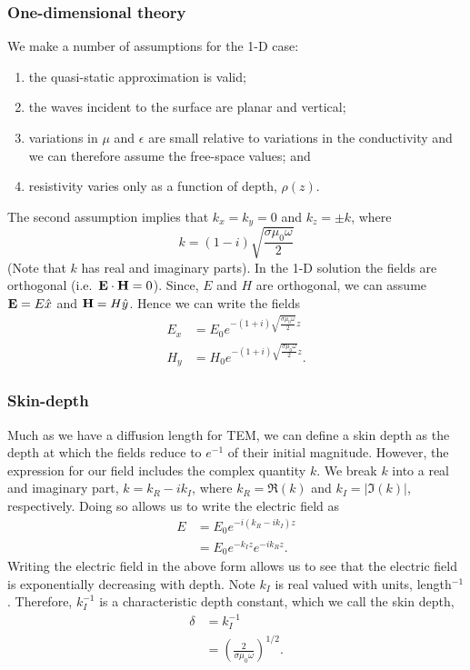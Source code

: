 \subsubsection{One-dimensional theory}
We make a number of assumptions for the 1-D case:
\begin{enumerate}
    \item the quasi-static approximation is valid; 
    \item the waves incident to the surface are planar and vertical;
    \item variations in $\mu$ and $\epsilon$ are small relative to variations in
    the conductivity and we can therefore assume the free-space values; and
    \item resistivity varies only as a function of depth, $\rho(z)$.
\end{enumerate}
The second assumption implies that $k_{x} = k_{y} = 0$ and $k_{z} = \pm k$,
where
\begin{equation}
    k = (1 - i) \sqrt{\frac{\sigma \mu_0 \omega}{2}}
\end{equation}
(Note that $k$ has real and imaginary parts).
In the 1-D solution the fields are orthogonal (i.e.\ $\vb{E} \cdot \vb{H} =
0$).  Since, $E$ and $H$ are orthogonal, we can assume $\vb{E} = E\hat{x}$ and
$\vb{H} = H\hat{y}$.  Hence we can write the fields
\begin{align}
    E_x & = E_0 e^{-(1 + i) \sqrt{\frac{\sigma \mu_0 \omega}{2}} z} \\
    H_y & = H_0 e^{-(1 + i) \sqrt{\frac{\sigma \mu_0 \omega}{2}} z}.
\end{align}

\subsubsection{Skin-depth}
Much as we have a diffusion length for TEM, we can define a skin depth as the
depth at which the fields reduce to $e^{-1}$ of their initial
magnitude.  However, the expression for our field includes the complex quantity
$k$.  We break $k$ into a real and imaginary part, $k = k_R - i k_I$, where $k_R
= \Re(k)$ and $k_I = |\Im(k)|$, respectively.  Doing so allows us to write the
electric field as
\begin{align*}
    E &= E_0 e^{-i(k_R - i k_I)z} \\
    &= E_0 e^{-k_I z} e^{-i k_R z} .
\end{align*}
Writing the electric field in the above form allows us to see that the electric
field is exponentially decreasing with depth.  Note $k_I$ is real valued with
units, length$^{-1}$.  Therefore, $k_I^{-1}$ is a characteristic depth constant,
which we call the skin depth,
\begin{align}
    \delta &= k_I^{-1} \\
    &= \left( \frac{2}{\sigma \mu_0 \omega} \right)^{1/2}.
\end{align}

